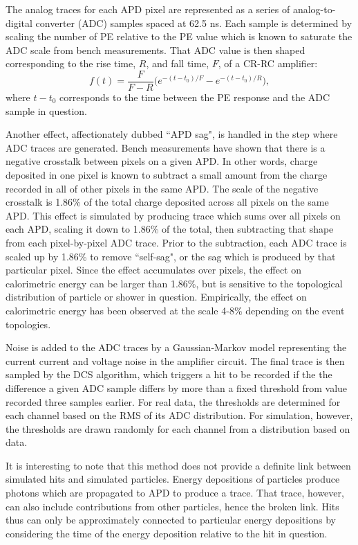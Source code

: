 The analog traces for each APD pixel are represented as a series of analog-to-digital converter (ADC) samples spaced at 62.5 ns.  Each sample is determined by scaling the number of PE relative to the PE value which is known to saturate the ADC scale from bench measurements.  That ADC value is then shaped corresponding to the rise time, $R$, and fall time, $F$, of a CR-RC amplifier:
\begin{equation}
f(t) = \frac{F}{F − R}\bigg (e^{-(t-t_0)/F} - e^{-(t-t_0)/R}\bigg ),
\end{equation}
where $t-t_0$ corresponds to the time between the PE response and the ADC sample in question.

Another effect, affectionately dubbed ``APD sag", is handled in the step where ADC traces are generated.  Bench measurements have shown that there is a negative crosstalk between pixels on a given APD.  In other words, charge deposited in one pixel is known to subtract a small amount from the charge recorded in all of other pixels in the same APD.  The scale of the negative crosstalk is 1.86\% of the total charge deposited across all pixels on the same APD.  This effect is simulated by producing trace which sums over all pixels on each APD, scaling it down to 1.86\% of the total, then subtracting that shape from each pixel-by-pixel ADC trace.  Prior to the subtraction, each ADC trace is scaled up by 1.86\% to remove ``self-sag", or the sag which is produced by that particular pixel.  Since the effect accumulates over pixels, the effect on calorimetric energy can be larger than 1.86\%, but is sensitive to the topological distribution of particle or shower in question.  Empirically, the effect on calorimetric energy has been observed at the scale 4-8\% depending on the event topologies.

Noise is added to the ADC traces by a Gaussian-Markov model representing the current current and voltage noise in the amplifier circuit.  The final trace is then sampled by the DCS algorithm, which triggers a hit to be recorded if the the difference a given ADC sample differs by more than a fixed threshold from value recorded three samples earlier.  For real data, the thresholds are determined for each channel based on the RMS of its ADC distribution.  For simulation, however, the thresholds are drawn randomly for each channel from a distribution based on data.

It is interesting to note that this method does not provide a definite link between simulated hits and simulated particles.  Energy depositions of particles produce photons which are propagated to APD to produce a trace.  That trace, however, can also include contributions from other particles, hence the broken link.  Hits thus can only be approximately connected to particular energy depositions by considering the time of the energy deposition relative to the hit in question.


